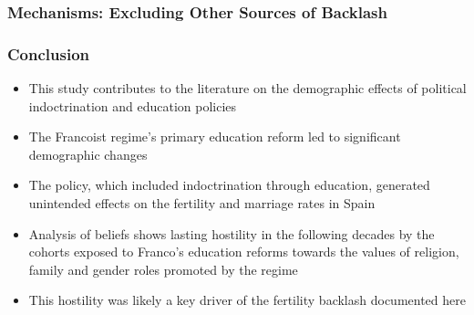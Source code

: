 \documentclass[aspectratio=169]{beamer}
\begin{document}
\begin{frame}
\frametitle{Mechanisms: Excluding Other Sources of Backlash}
\label{mech}
\begin{table}[h!]
	\center
\end{table}

\hyperlink{event_cis}{}
\end{frame}







\begin{frame}
\frametitle{Conclusion}
\begin{itemize}
\item This study contributes to the  literature on the demographic effects of political indoctrination and education policies
\medskip

    \item The Francoist regime's primary education reform led to significant demographic changes
    \medskip

\item The policy, which included indoctrination through education, generated unintended effects on the fertility and marriage rates in Spain
\medskip

\item Analysis of beliefs shows lasting hostility in the following decades by the cohorts exposed to Franco's education reforms towards the values of religion, family and gender roles promoted by the regime
\medskip

\item This hostility was likely a key driver of the fertility backlash documented here
\end{itemize}
\end{frame}
\end{document}
